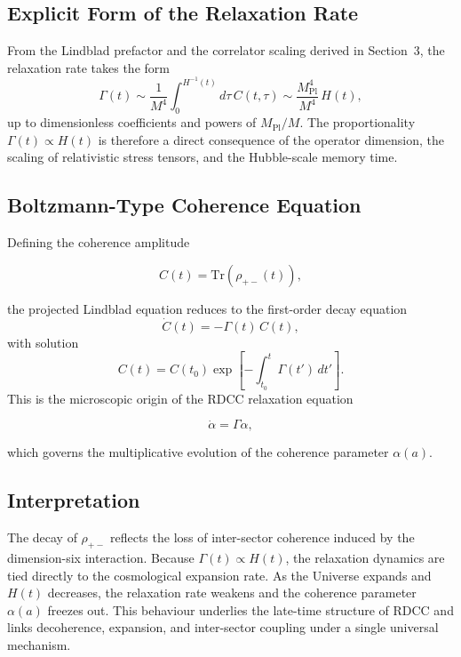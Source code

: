 \documentclass[11pt,a4paper]{article}
\newcommand{\rpm}{\rho_{+-}}
\newcommand{\RelaxEq}{\dot{\alpha} = \Gamma \alpha}
\newcommand{\Trm}{\mathrm{Tr}}
\begin{document}
\subsection{Explicit Form of the Relaxation Rate}

From the Lindblad prefactor and the correlator scaling derived in Section~3, the
relaxation rate takes the form
\begin{equation}
\Gamma(t)
    \sim \frac{1}{M^{4}}
         \int_{0}^{H^{-1}(t)}
         d\tau\, C(t,\tau)
    \sim \frac{M_{\mathrm{Pl}}^{4}}{M^{4}}\, H(t),
\end{equation}
up to dimensionless coefficients and powers of \(M_{\mathrm{Pl}}/M\). The
proportionality \(\Gamma(t) \propto H(t)\) is therefore a direct consequence of
the operator dimension, the scaling of relativistic stress tensors, and the
Hubble-scale memory time.

\subsection{Boltzmann-Type Coherence Equation}

Defining the coherence amplitude


\[
C(t) = \Trm(\rpm(t)),
\]


the projected Lindblad equation reduces to the first-order decay equation
\begin{equation}
\dot{C}(t) = -\Gamma(t)\, C(t),
\end{equation}
with solution
\begin{equation}
C(t)
    = C(t_{0})
      \exp\!\left[
          -\int_{t_{0}}^{t}
           \Gamma(t')\, dt'
      \right].
\end{equation}
This is the microscopic origin of the RDCC relaxation equation


\[
\RelaxEq,
\]


which governs the multiplicative evolution of the coherence parameter
\(\alpha(a)\).

\subsection{Interpretation}

The decay of \(\rpm\) reflects the loss of inter-sector coherence induced by the
dimension-six interaction. Because \(\Gamma(t) \propto H(t)\), the relaxation
dynamics are tied directly to the cosmological expansion rate. As the Universe
expands and \(H(t)\) decreases, the relaxation rate weakens and the coherence
parameter \(\alpha(a)\) freezes out. This behaviour underlies the late-time
structure of RDCC and links decoherence, expansion, and inter-sector coupling
under a single universal mechanism.
\end{document}

